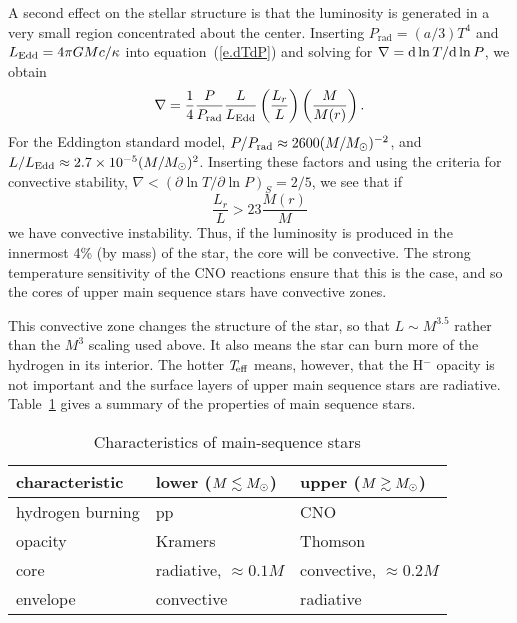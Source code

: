 A second effect on the stellar structure is that the luminosity is generated in a very small region concentrated about the center.  Inserting $P_{\mathrm{rad}} = (a/3) T^{4}$ and $L_{\mathrm{Edd}} = 4\pi GMc/\kappa$ into equation~(\ref{e.dTdP}) and solving for $\nabla = \mathrm{d}\ln T/\mathrm{d}\ln P$, we obtain
\begin{equation}\label{e.del}
\nabla = \frac{1}{4}\frac{P}{P_{\mathrm{rad}}}\frac{L}{L_{\mathrm{Edd}}}\left(\frac{L_{r}}{L}\right)\left(\frac{M}{M(r)}\right).
\end{equation}
For the Eddington standard model, $P/P_{\mathrm{rad}} \approx 2600 (M/M_\odot)^{-2}$, and $L/L_{\mathrm{Edd}} \approx 2.7\times 10^{-5} (M/M_\odot)^{2}$.  Inserting these factors and using the criteria for convective stability, $\nabla < (\partial\ln T/\partial\ln P)_{S} = 2/5$,  we see that if 
\[ \frac{L_{r}}{L} > 23 \frac{M(r)}{M} \]
we have convective instability.  Thus, if the luminosity is produced in the innermost 4\% (by mass) of the star, the core will be convective.  The strong temperature sensitivity of the CNO reactions ensure that this is the case, and so the cores of upper main sequence stars have convective zones.

This convective zone changes the structure of the star, so that $L\sim M^{3.5}$ rather than the $M^{3}$ scaling used above.  It also means the star can burn more of the hydrogen in its interior.  The hotter $T_{\!\mathrm{eff}}$ means, however, that the H$^{-}$ opacity is not important and the surface layers of upper main sequence stars are radiative.  Table~\ref{t.MS-characteristics} gives a summary of the properties of main sequence stars.

\begin{table}
\caption{\label{t.MS-characteristics} Characteristics of main-sequence stars}
\centering
\begin{tabular}{lll}
\hline
characteristic & lower ($M\lesssim M_\odot$) & upper ($M\gtrsim M_\odot$)\\
\hline\hline
hydrogen burning & pp & CNO\\
opacity & Kramers & Thomson\\
core & radiative, $\approx 0.1M$  & convective, $\approx 0.2 M$\\
envelope & convective & radiative\\
\hline
\end{tabular}
\end{table}

